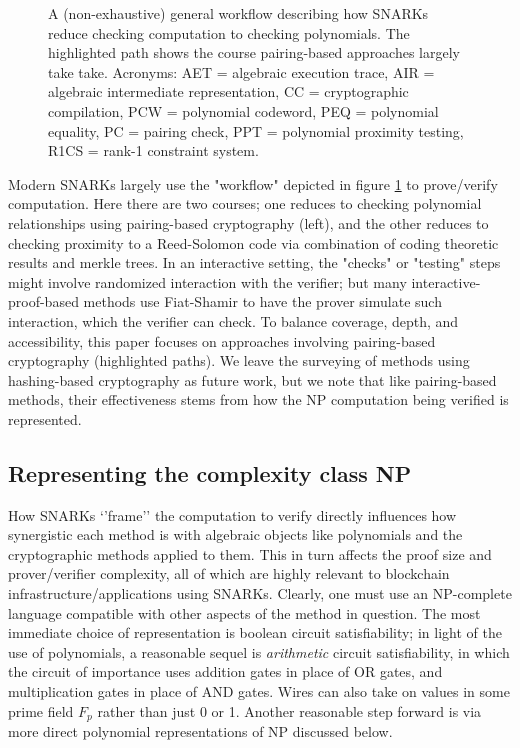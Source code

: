 \begin{figure}[htbp]
    \caption{A (non-exhaustive) general workflow describing how SNARKs reduce checking computation to checking polynomials. The highlighted path shows the course pairing-based approaches largely take take. Acronyms: AET = algebraic execution trace, AIR = algebraic intermediate representation, CC = cryptographic compilation, PCW = polynomial codeword, PEQ = polynomial equality, PC = pairing check, PPT = polynomial proximity testing, R1CS = rank-1 constraint system.}
    \label{fig:snark-workflow}
\end{figure}
\noindent Modern SNARKs largely use the "workflow" depicted in figure \ref{fig:snark-workflow} to prove/verify computation. Here there are two courses; one reduces to checking polynomial relationships using pairing-based cryptography (left), and the other reduces to checking proximity to a Reed-Solomon code via combination of coding theoretic results and merkle trees. In an interactive setting, the "checks" or "testing" steps might involve randomized interaction with the verifier; but many interactive-proof-based methods use Fiat-Shamir to have the prover simulate such interaction, which the verifier can check. To balance coverage, depth, and accessibility, this paper focuses on approaches involving pairing-based cryptography (highlighted paths). We leave the surveying of methods using hashing-based cryptography as future work, but we note that like pairing-based methods, their effectiveness stems from how the NP computation being verified is represented.

\subsection{Representing the complexity class NP}
\noindent How SNARKs `'frame'' the computation to verify directly influences how synergistic each method is with algebraic objects like polynomials and the cryptographic methods applied to them. This in turn affects the proof size and prover/verifier complexity, all of which are highly relevant to blockchain infrastructure/applications using SNARKs. Clearly, one must use an NP-complete language compatible with other aspects of the method in question. The most immediate choice of representation is boolean circuit satisfiability; in light of the use of polynomials, a reasonable sequel is \textit{arithmetic} circuit satisfiability, in which the circuit of importance uses addition gates in place of OR gates, and multiplication gates in place of AND gates. Wires can also take on values in some prime field $F_p$  rather than just 0 or 1. Another reasonable step forward is via more direct polynomial representations of NP discussed below.

